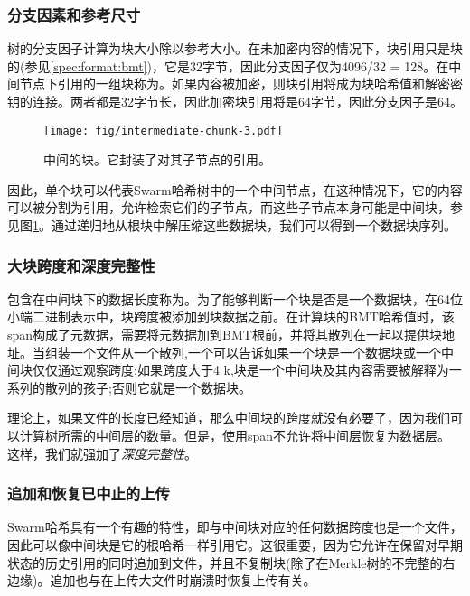 \subsubsection{分支因素和参考尺寸}

树的分支因子计算为块大小除以参考大小。在未加密内容的情况下，块引用只是块的(参见\ref{spec:format:bmt})，它是32字节，因此分支因子仅为4096/32 = 128。在中间节点下引用的一组块称为。如果内容被加密，则块引用将成为块哈希值和解密密钥的连接。两者都是32字节长，因此加密块引用将是64字节，因此分支因子是64。 


\begin{figure}[htbp]
\centering
\texttt{[image: fig/intermediate-chunk-3.pdf]}
\caption[中间块\statusgreen]{中间的块。它封装了对其子节点的引用。}
\label{fig:intermediate-chunk}
\end{figure}

因此，单个块可以代表Swarm哈希树中的一个中间节点，在这种情况下，它的内容可以被分割为引用，允许检索它们的子节点，而这些子节点本身可能是中间块，参见图\ref{fig:intermediate-chunk}。通过递归地从根块中解压缩这些数据块，我们可以得到一个数据块序列。 

 \subsubsection{大块跨度和深度完整性}

包含在中间块下的数据长度称为。为了能够判断一个块是否是一个数据块，在64位小端二进制表示中，块跨度被添加到块数据之前。在计算块的BMT哈希值时，该span构成了元数据，需要将元数据加到BMT根前，并将其散列在一起以提供块地址。当组装一个文件从一个散列,一个可以告诉如果一个块是一个数据块或一个中间块仅仅通过观察跨度:如果跨度大于4 k,块是一个中间块及其内容需要被解释为一系列的散列的孩子;否则它就是一个数据块。

理论上，如果文件的长度已经知道，那么中间块的跨度就没有必要了，因为我们可以计算树所需的中间层的数量。但是，使用span不允许将中间层恢复为数据层。这样，我们就强加了\emph{深度完整性}。 

\subsubsection{追加和恢复已中止的上传}

Swarm哈希具有一个有趣的特性，即与中间块对应的任何数据跨度也是一个文件，因此可以像中间块是它的根哈希一样引用它。这很重要，因为它允许在保留对早期状态的历史引用的同时追加到文件，并且不复制块(除了在Merkle树的不完整的右边缘)。追加也与在上传大文件时崩溃时恢复上传有关。


